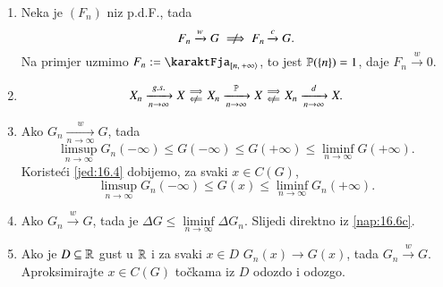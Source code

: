 \begin{nap} \label{nap:16.6}
    \begin{enumerate}[label=(\alph*)]
        \item Neka je $(F_n)$ niz p.d.F., tada
        \begin{equation*}
            F_n \xrightarrow{w} G \centernot\implies F_n \xrightarrow{c} G.
        \end{equation*}
        Na primjer uzmimo $F_n := \karaktFja_{\desInt{n}{+\infty}}$, to jest $\mathbb{P}(\{n\}) = 1$, daje $F_n \xrightarrow{w} 0$.
        \item
        \begin{equation*}
            X_n \xrightarrow[n \to \infty]{g.s.} X
            \begin{smallmatrix}
                \implies\\
                \notimpliedby
            \end{smallmatrix}
            X_n \xrightarrow[n \to \infty]{\masP} X
            \begin{smallmatrix}
                \implies\\
                \notimpliedby
            \end{smallmatrix}
            X_n \xrightarrow[n \to \infty]{d} X.
        \end{equation*}
        \item   \label{nap:16.6c}
        Ako $G_n \xrightarrow[n \to \infty]{w} G$, tada
            \begin{equation*}
                \limsup\limits_{n \to \infty} G_n(-\infty) \leq G(-\infty) \leq G(+ \infty) \leq \liminf\limits_{n \to \infty} G(+\infty).
            \end{equation*}
            Koriste\' ci \eqref{jed:16.4} dobijemo, za svaki $x \in C(G)$,
            \begin{equation*}
                \limsup\limits_{n \to \infty} G_n (-\infty) \leq G(x) \leq \liminf\limits_{n \to \infty} G_n (+\infty).
            \end{equation*}
        \item   \label{nap:16.6d}
        Ako $G_n \xrightarrow{w} G$, tada je $\Delta G \leq \liminf\limits_{n \to \infty} \Delta G_n$.
        Slijedi direktno iz \ref{nap:16.6c}.
        \item   \label{nap:16.6e}
        Ako je $D \subseteq \mathbb{R}$ gust u $\mathbb{R}$ i za svaki $x \in D$ $G_n (x) \xrightarrow{} G (x)$, tada $G_n \xrightarrow{w} G$.
        Aproksimirajte $x \in C(G)$ to\v ckama iz $D$ odozdo i odozgo.

\end{enumerate}
\end{nap}
